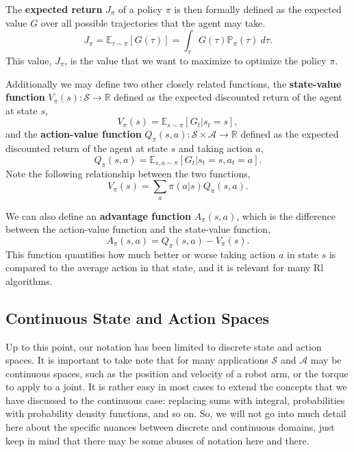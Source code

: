 \documentclass[12pt]{report}
\theoremstyle{definition}
\theoremstyle{remark}
\begin{document}
The \textbf{expected return} $J_\pi$ of a policy $\pi$ is then formally defined as the expected value $G$ over all possible trajectories that the agent may take.
\begin{equation}\label{eq:expected-return}
    J_\pi = \mathbb{E}_{\tau\sim\pi}[G(\tau)] = \int_{\tau} G(\tau)\mathbb{P}_\pi(\tau)\ d\tau.
\end{equation}
This value, $J_\pi$, is the value that we want to maximize to optimize the policy $\pi$.

Additionally we may define two other closely related functions, the \textbf{state-value function} $V_\pi(s): \mathcal{S} \to \mathbb{R}$ defined as the expected discounted return of the agent at state $s$,
\begin{equation}
    V_\pi(s) = \mathbb{E}_{s\sim\pi}[G_t | s_t = s],
\end{equation}
and the \textbf{action-value function} $Q_\pi(s, a): \mathcal{S} \times \mathcal{A} \to \mathbb{R}$ defined as the expected discounted return of the agent at state $s$ and taking action $a$,
\begin{equation}
    Q_\pi(s, a) = \mathbb{E}_{s, a\sim\pi}[G_t | s_t = s, a_t = a].
\end{equation}
Note the following relationship between the two functions,
\begin{equation}
    V_\pi(s) = \sum_a \pi(a | s) Q_\pi(s, a).
\end{equation}

We can also define an \textbf{advantage function} $A_\pi(s, a)$, which is the difference between the action-value function and the state-value function,
\begin{equation}
    A_\pi(s, a) = Q_\pi(s, a) - V_\pi(s).
\end{equation}
This function quantifies how much better or worse taking action $a$ in state $s$ is compared to the average action in that state, and it is relevant for many Rl algorithms.

\subsection{Continuous State and Action Spaces}
Up to this point, our notation has been limited to discrete state and action spaces. It is important to take note that for many applications $\mathcal{S}$ and $\mathcal{A}$ may be continuous spaces, such as the position and velocity of a robot arm, or the torque to apply to a joint. It is rather easy in most cases to extend the concepts that we have discussed to the continuous case: replacing sums with integral, probabilities with probability density functions, and so on. So, we will not go into much detail here about the specific nuances between discrete and continuous domains, just keep in mind that there may be some abuses of notation here and there.
\end{document}
